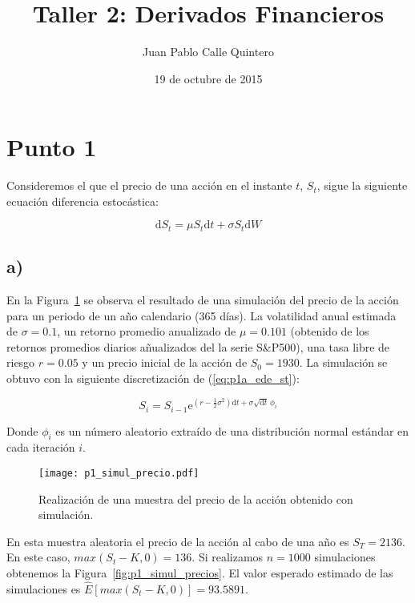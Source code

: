 \documentclass{tufte-handout}
\title{Taller 2: Derivados Financieros}
\author{Juan Pablo Calle Quintero}
\date{19 de octubre de 2015}
\begin{document}
\maketitle

\section*{Punto 1}

Consideremos el que el precio de una acción en el instante $t$, $S_t$, sigue la siguiente ecuación diferencia estocástica:

\begin{equation} \label{eq:p1a_ede_st}
	\mathrm{d}S_t = \mu S_t \mathrm{d}t + \sigma S_t \mathrm{d}W
\end{equation}

\subsection*{a)}

En la Figura~\ref{fig:p1_simul_precio} se observa el resultado de una simulación del precio de la acción para un periodo de un año calendario (365 días). La volatilidad anual estimada de $\sigma = 0.1$, un retorno promedio anualizado de $\mu = 0.101$ (obtenido de los retornos promedios diarios añualizados del la serie S\&P500), una tasa libre de riesgo $r = 0.05$ y un precio inicial de la acción de $S_0 = 1930$. La simulación se obtuvo con la siguiente discretización de (\ref{eq:p1a_ede_st}):

\begin{equation} \label{eq:p1a_ecn_simul}
	S_i = S_{i-1} \mathrm{e}^{(r - \frac{1}{2}\sigma^2)\mathrm{d}t + \sigma \sqrt{\mathrm{d}t} \, \phi_i}
\end{equation}

Donde $\phi_i$ es un número aleatorio extraído de una distribución normal estándar en cada iteración $i$.

\begin{figure}[!h]
    \texttt{[image: p1\_simul\_precio.pdf]}
    \caption{Realización de una muestra del precio de la acción obtenido con simulación.}
    \label{fig:p1_simul_precio}
\end{figure}

En esta muestra aleatoria el precio de la acción al cabo de una año es $S_T=2136$. En este caso, $max(S_t - K, 0) = 136$. Si realizamos $n = 1000$ simulaciones obtenemos la Figura~\ref{fig:p1_simul_precios}. El valor esperado estimado de las simulaciones es $\hat{E}[max(S_t - K, 0)] = 93.5891$.
\end{document}
